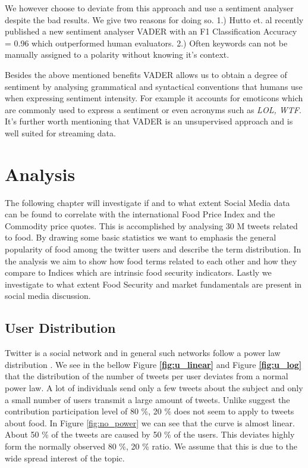 We however choose to deviate from this approach and use a sentiment analyser despite the bad results. We give two reasons for doing so. 1.) Hutto et. al recently published a new sentiment analyser VADER \cite{hutton14} with an F1 Classification Accuracy = 0.96 which  outperformed human evaluators. 2.) Often keywords can not be manually assigned to a polarity without knowing it's context. 

Besides the above mentioned benefits VADER allows us to obtain a degree of sentiment by analysing grammatical and syntactical conventions that humans use when expressing sentiment intensity. For example it accounts for emoticons which are commonly used to express a sentiment or even acronyms such as \emph{LOL, WTF}. It's further worth mentioning that VADER is an unsupervised approach and is well suited for streaming data. 






\chapter{Analysis}

The following chapter will investigate if and to what extent Social Media data can be found
to correlate with the international Food Price Index and the Commodity price quotes. This is accomplished by analysing 30 M tweets related to food. By drawing some basic statistics we want to emphasis the general popularity of food among the twitter users and describe the term distribution. In the analysis we aim to show how food terms related to each other and how they compare to Indices which are intrinsic food security indicators. Lastly we investigate to what extent Food Security and market fundamentals are present in social media discussion. 


\section {User Distribution}

Twitter is a social network and in general such networks follow a power law distribution \cite{Whittaker:1998}. We see in the bellow Figure \textbf{\ref{fig:u_linear}} and Figure \textbf{\ref{fig:u_log}}  that the distribution of the number of tweets per user deviates from a normal power law. A lot of individuals  send only a few tweets about the subject and only a small number of users transmit a large amount of tweets. Unlike \cite{bild15} suggest the contribution participation level of  80 \%, 20 \%   does not seem to apply to tweets about food. In Figure \ref{fig:no_power} we can see that the curve is almost linear. About 50 \% of the tweets are caused by 50 \% of the users. This deviates highly form the normally observed 80 \%, 20 \% ratio. We assume that this is due to the wide spread interest of the topic.




